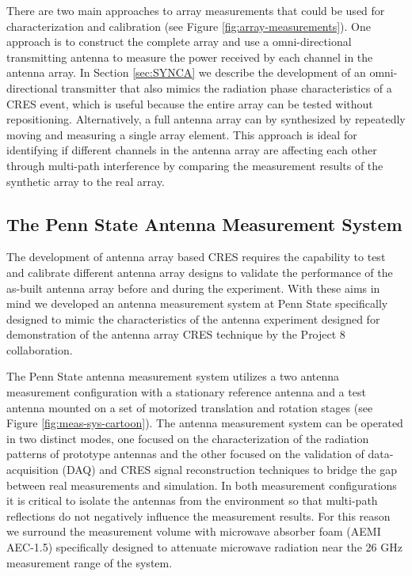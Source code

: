 There are two main approaches to array measurements that could be used for characterization and calibration (see Figure \ref{fig:array-measurements}). One approach is to construct the complete array and use a omni-directional transmitting antenna to measure the power received by each channel in the antenna array. In Section \ref{sec:SYNCA} we describe the development of an omni-directional transmitter that also mimics the radiation phase characteristics of a CRES event, which is useful because the entire array can be tested without repositioning. Alternatively, a full antenna array can by synthesized by repeatedly moving and measuring a single array element. This approach is ideal for identifying if different channels in the antenna array are affecting each other through multi-path interference by comparing the measurement results of the synthetic array to the real array. 

\subsection{The Penn State Antenna Measurement System}
\label{sec:antenna_measurement_system}

The development of antenna array based CRES requires the capability to test and calibrate different antenna array designs to validate the performance of the as-built antenna array before and during the experiment. With these aims in mind we developed an antenna measurement system at Penn State specifically designed to mimic the characteristics of the antenna experiment designed for demonstration of the antenna array CRES technique by the Project 8 collaboration. 

The Penn State antenna measurement system utilizes a two antenna measurement configuration with a stationary reference antenna and a test antenna mounted on a set of motorized translation and rotation stages (see Figure \ref{fig:meas-sys-cartoon}). The antenna measurement system can be operated in two distinct modes, one focused on the characterization of the radiation patterns of prototype antennas and the other focused on the validation of data-acquisition (DAQ) and CRES signal reconstruction techniques to bridge the gap between real measurements and simulation. In both measurement configurations it is critical to isolate the antennas from the environment so that multi-path reflections do not negatively influence the measurement results. For this reason we surround the measurement volume with microwave absorber foam (AEMI AEC-1.5) \cite{absorber_foam} specifically designed to attenuate microwave radiation near the 26 GHz measurement range of the system.

